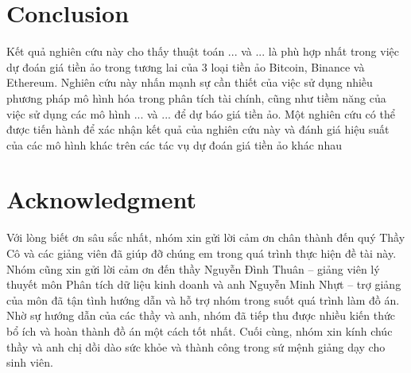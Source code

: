 \documentclass[conference]{IEEEtran}
\begin{document}
\section{Conclusion}
Kết quả nghiên cứu này cho thấy thuật toán ... và ... là phù hợp nhất trong việc dự đoán giá tiền ảo trong tương lai của 3 loại tiền ảo Bitcoin, Binance và Ethereum. Nghiên cứu này nhấn mạnh sự cần thiết của việc sử dụng nhiều phương pháp mô hình hóa trong phân tích tài chính, cũng như tiềm năng của việc sử dụng các mô hình ... và ... để dự báo giá tiền ảo. Một nghiên cứu có thể được tiến hành để xác nhận kết quả của nghiên cứu này và đánh giá hiệu suất của các mô hình khác trên các tác vụ dự đoán giá tiền ảo khác nhau
\section*{Acknowledgment}
Với lòng biết ơn sâu sắc nhất, nhóm xin gửi lời cảm ơn chân thành đến quý Thầy Cô và các giảng viên đã giúp đỡ chúng em trong quá trình thực hiện đề tài này. Nhóm cũng xin gửi lời cảm ơn đến thầy Nguyễn Đình Thuân – giảng viên lý thuyết môn Phân tích dữ liệu kinh doanh và anh Nguyễn Minh Nhựt – trợ giảng của môn đã tận tình hướng dẫn và hỗ trợ nhóm trong suốt quá trình làm đồ án. Nhờ sự hướng dẫn của các thầy và anh, nhóm đã tiếp thu được nhiều kiến thức bổ ích và hoàn thành đồ án một cách tốt nhất. Cuối cùng, nhóm xin kính chúc thầy và anh chị dồi dào sức khỏe và thành công trong sứ mệnh giảng dạy cho sinh viên. 
\end{document}
